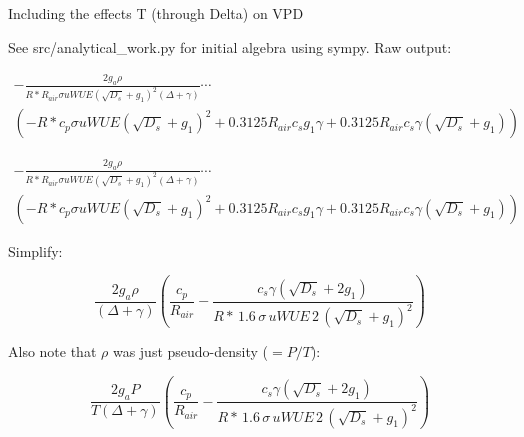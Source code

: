 
\usepackage{graphics, graphicx}
\graphicspath{ {./} } %


\begin{center}
\large{Including the effects T (through Delta) on VPD}\end{center}

\bigskip

See src/analytical\_work.py for initial algebra using sympy. Raw output:

\begin{multline}
  - \frac{2 g_{a} \rho}{R* R_{air} \sigma uWUE \left(\sqrt{D_{s}} + g_{1}\right)^{2} \left(\Delta + \gamma\right)}\cdots \\
  \left(- R* c_{p} \sigma uWUE \left(\sqrt{D_{s}} + g_{1}\right)^{2} + 0.3125 R_{air} c_{s} g_{1} \gamma + 0.3125 R_{air} c_{s} \gamma \left(\sqrt{D_{s}} + g_{1}\right)\right)
\end{multline}

\begin{multline}
  - \frac{2 g_{a} \rho}{R* R_{air} \sigma uWUE \left(\sqrt{D_{s}} + g_{1}\right)^{2} \left(\Delta + \gamma\right)} \cdots\\
  \left(- R* c_{p} \sigma uWUE \left(\sqrt{D_{s}} + g_{1}\right)^{2} + 0.3125 R_{air} c_{s} g_{1} \gamma + 0.3125 R_{air} c_{s} \gamma \left(\sqrt{D_{s}} + g_{1}\right)\right)
\end{multline}

Simplify:

\begin{equation}
\frac{ 2 g_{a} \rho}{\left(\Delta + \gamma\right)}  \left(\frac{c_{p}}{R_{air}} - \frac{ c_{s} \gamma  \left(\sqrt{D_{s}} + 2 g_{1}\right)}{R* \, 1.6 \, \sigma \, uWUE \, 2 \, \left(\sqrt{D_{s}} + g_{1}\right)^{2}}\right)
\end{equation}

Also note that $\rho$ was just pseudo-density ($=P/T$):

\begin{equation}
\frac{ 2 g_{a} P }{ T \left(\Delta + \gamma\right)}  \left(\frac{c_{p}}{R_{air}} - \frac{ c_{s} \gamma  \left(\sqrt{D_{s}} + 2 g_{1}\right)}{R* \, 1.6 \, \sigma \, uWUE \, 2 \, \left(\sqrt{D_{s}} + g_{1}\right)^{2}}\right)
\end{equation}


